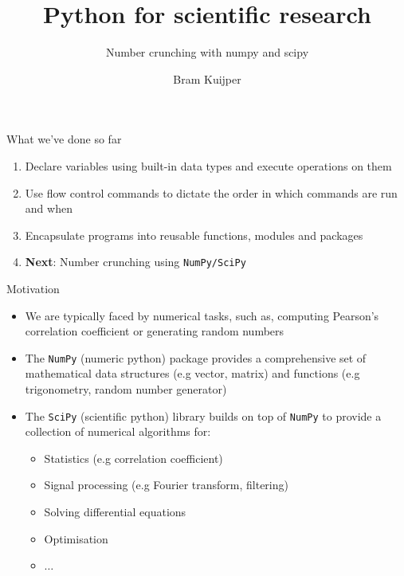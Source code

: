 \documentclass[xcolor=table]{beamer}
\title[Python for scientific research]{Python for scientific research}
\subtitle{Number crunching with numpy and scipy}
\author{Bram Kuijper}
\institute[]{University of Exeter, Penryn Campus, UK}
\begin{document}
\begin{frame}
\titlepage
\end{frame}

\begin{frame}{What we've done so far}

	\begin{enumerate}\addtolength{\itemsep}{1\baselineskip}
		\item Declare variables using built-in data types and execute operations
		on them
		\item Use flow control commands to dictate the order in which commands are run
		and when
		\item Encapsulate programs into reusable functions, modules and packages
		\item \textbf{Next}: Number crunching using \texttt{NumPy/SciPy}
	\end{enumerate}

\end{frame}

\begin{frame}{Motivation}

\begin{itemize}\addtolength{\itemsep}{\baselineskip}
	\item<1-> We are typically faced by numerical tasks, 
	such as, computing Pearson's correlation coefficient
	or generating random numbers

	\item<2-> The \texttt{NumPy} (numeric python) package provides
	a comprehensive set of mathematical data structures (e.g vector, matrix)
	and functions (e.g trigonometry, random number generator) 

	\item<3-> The \texttt{SciPy} (scientific python) library builds on top
	of \texttt{NumPy} to provide a collection of numerical algorithms for: 
	\begin{itemize}
		\item<4-> Statistics (e.g correlation coefficient)
		\item<5-> Signal processing (e.g Fourier transform, filtering)
		\item<6-> Solving differential equations
		\item<7-> Optimisation
		\item<8-> $\ldots$
	\end{itemize}
\end{itemize}
\end{frame}
\end{document}
